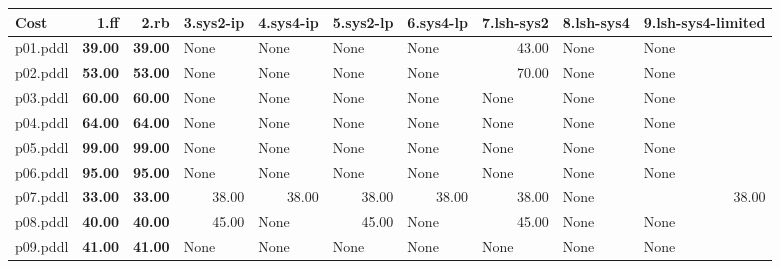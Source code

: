 \documentclass{article}
\begin{document}
\begin{tabular}{@{}lrrrrrrrrr@{}}
Cost & 1.ff & 2.rb & 3.sys2-ip & 4.sys4-ip & 5.sys2-lp & 6.sys4-lp & 7.lsh-sys2 & 8.lsh-sys4 & 9.lsh-sys4-limited \\
\midrule
p01.pddl & \textbf{39.00} & \textbf{39.00} & \multicolumn{1}{|l|}{None} & \multicolumn{1}{|l|}{None} & \multicolumn{1}{|l|}{None} & \multicolumn{1}{|l|}{None} & 43.00 & \multicolumn{1}{|l|}{None} & \multicolumn{1}{|l|}{None} \\
p02.pddl & \textbf{53.00} & \textbf{53.00} & \multicolumn{1}{|l|}{None} & \multicolumn{1}{|l|}{None} & \multicolumn{1}{|l|}{None} & \multicolumn{1}{|l|}{None} & 70.00 & \multicolumn{1}{|l|}{None} & \multicolumn{1}{|l|}{None} \\
p03.pddl & \textbf{60.00} & \textbf{60.00} & \multicolumn{1}{|l|}{None} & \multicolumn{1}{|l|}{None} & \multicolumn{1}{|l|}{None} & \multicolumn{1}{|l|}{None} & \multicolumn{1}{|l|}{None} & \multicolumn{1}{|l|}{None} & \multicolumn{1}{|l|}{None} \\
p04.pddl & \textbf{64.00} & \textbf{64.00} & \multicolumn{1}{|l|}{None} & \multicolumn{1}{|l|}{None} & \multicolumn{1}{|l|}{None} & \multicolumn{1}{|l|}{None} & \multicolumn{1}{|l|}{None} & \multicolumn{1}{|l|}{None} & \multicolumn{1}{|l|}{None} \\
p05.pddl & \textbf{99.00} & \textbf{99.00} & \multicolumn{1}{|l|}{None} & \multicolumn{1}{|l|}{None} & \multicolumn{1}{|l|}{None} & \multicolumn{1}{|l|}{None} & \multicolumn{1}{|l|}{None} & \multicolumn{1}{|l|}{None} & \multicolumn{1}{|l|}{None} \\
p06.pddl & \textbf{95.00} & \textbf{95.00} & \multicolumn{1}{|l|}{None} & \multicolumn{1}{|l|}{None} & \multicolumn{1}{|l|}{None} & \multicolumn{1}{|l|}{None} & \multicolumn{1}{|l|}{None} & \multicolumn{1}{|l|}{None} & \multicolumn{1}{|l|}{None} \\
p07.pddl & \textbf{33.00} & \textbf{33.00} & 38.00 & 38.00 & 38.00 & 38.00 & 38.00 & \multicolumn{1}{|l|}{None} & 38.00 \\
p08.pddl & \textbf{40.00} & \textbf{40.00} & 45.00 & \multicolumn{1}{|l|}{None} & 45.00 & \multicolumn{1}{|l|}{None} & 45.00 & \multicolumn{1}{|l|}{None} & \multicolumn{1}{|l|}{None} \\
p09.pddl & \textbf{41.00} & \textbf{41.00} & \multicolumn{1}{|l|}{None} & \multicolumn{1}{|l|}{None} & \multicolumn{1}{|l|}{None} & \multicolumn{1}{|l|}{None} & \multicolumn{1}{|l|}{None} & \multicolumn{1}{|l|}{None} & \multicolumn{1}{|l|}{None} \\

\end{tabular}
\end{document}
